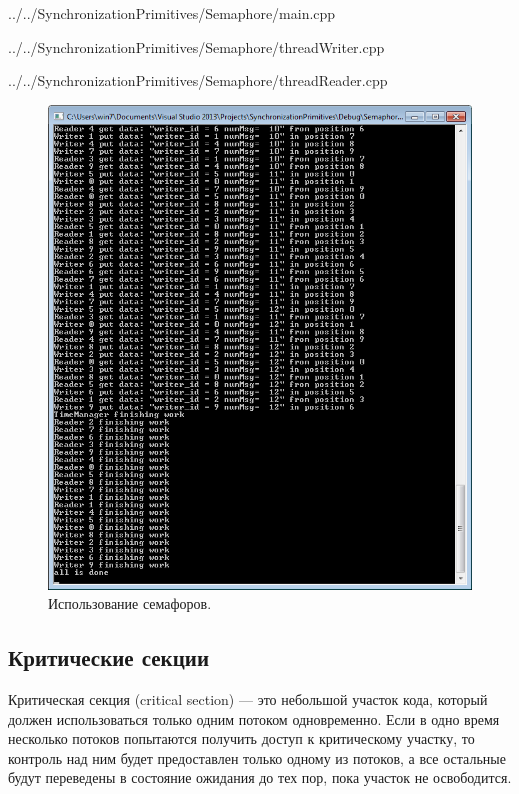 \documentclass[a4paper, 12pt]{article}		%
\begin{document}

{../../SynchronizationPrimitives/Semaphore/main.cpp}


{../../SynchronizationPrimitives/Semaphore/threadWriter.cpp}


{../../SynchronizationPrimitives/Semaphore/threadReader.cpp}

\begin{figure}[h!]
\centering
\includegraphics[scale=1]{res/002}
\caption{Использование семафоров.}
\end{figure}

\newpage
\subsection{Критические секции}

Критическая секция (critical section) — это небольшой участок кода, который должен использоваться только одним потоком одновременно. Если в одно время несколько потоков попытаются получить доступ к критическому участку, то контроль над ним будет предоставлен только одному из потоков, а все остальные будут переведены в состояние ожидания до тех пор, пока участок не освободится.
\end{document}
